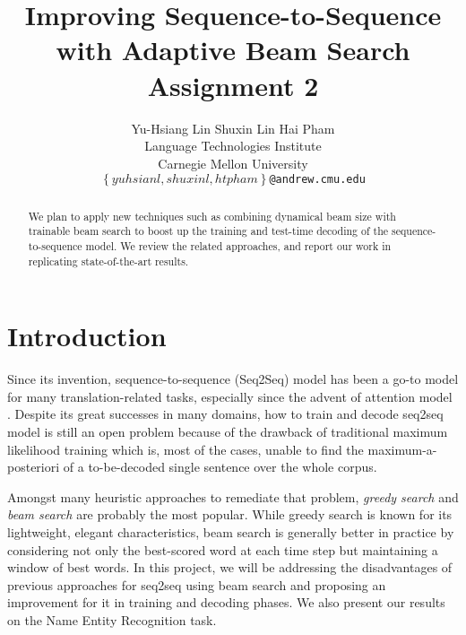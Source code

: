 \documentclass[11pt,a4paper]{article}
\title{Improving Sequence-to-Sequence with Adaptive Beam Search \newline \newline	
		Assignment 2}
\author{Yu-Hsiang Lin \quad Shuxin Lin \quad Hai Pham \\
  Language Technologies Institute \\
  Carnegie Mellon University \\
{\tt\small $\left\{yuhsianl, shuxinl, htpham\right\}$@andrew.cmu.edu}
  }
\date{}
\begin{document}
\maketitle
\begin{abstract}
We plan to apply new techniques such as combining dynamical beam size with trainable beam search to boost up the training and test-time decoding of the sequence-to-sequence model. We review the related approaches, and report our work in replicating state-of-the-art results.
\end{abstract}

\section{Introduction} \label{sec:introduction}
Since its invention, sequence-to-sequence (Seq2Seq) model \cite{seq2seq_2014} has been a go-to model for many translation-related tasks,  %
especially since the advent of attention model \cite{bahdanau2014neural,luong2015effective}. Despite its great successes in many domains, how to train and decode seq2seq model is still an open problem because of the drawback of traditional maximum likelihood training which is, most of the cases, unable to find the maximum-a-posteriori of a to-be-decoded single sentence over the whole corpus. 

Amongst many heuristic approaches to remediate that problem, \textit{greedy search} and \textit{beam search} are probably the most popular. While greedy search is known for its lightweight, elegant characteristics, beam search is generally better in practice by considering not only the best-scored word at each time step but maintaining a window of best words. 
In this project, we will be addressing the disadvantages of previous approaches for seq2seq using beam search and proposing an improvement for it in training and decoding phases. We also present our results on the Name Entity Recognition task.
\end{document}
